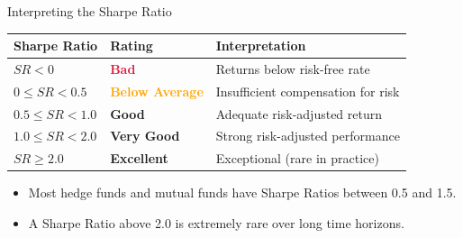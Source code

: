\documentclass[9pt, aspectratio=169, t]{beamer}
\theoremstyle{definition}
\begin{document}
\begin{frame}{Interpreting the Sharpe Ratio}

\begin{center}
\renewcommand{\arraystretch}{1.6}
\begin{tabular}{>{\centering\arraybackslash}m{3.5cm} >{\centering\arraybackslash}m{4cm} >{\centering\arraybackslash}m{5cm}}
\toprule
\textbf{Sharpe Ratio} & \textbf{Rating} & \textbf{Interpretation} \\
\midrule
\cellcolor{Crimson!20} $SR < 0$ & \cellcolor{Crimson!20}\textcolor{Crimson}{\textbf{Bad}} & \cellcolor{Crimson!20} Returns below risk-free rate \\
\cellcolor{Orange!20} $0 \leq SR < 0.5$ & \cellcolor{Orange!20}\textcolor{Orange}{\textbf{Below Average}} & \cellcolor{Orange!20} Insufficient compensation for risk \\
\cellcolor{Amber!20} $0.5 \leq SR < 1.0$ & \cellcolor{Amber!20}\textcolor{Amber}{\textbf{Good}} & \cellcolor{Amber!20} Adequate risk-adjusted return \\
\cellcolor{Forest!15} $1.0 \leq SR < 2.0$ & \cellcolor{Forest!15}\textcolor{Forest}{\textbf{Very Good}} & \cellcolor{Forest!15} Strong risk-adjusted performance \\
\cellcolor{Forest!30} $SR \geq 2.0$ & \cellcolor{Forest!30}\textcolor{Forest!80!black}{\textbf{Excellent}} & \cellcolor{Forest!30} Exceptional (rare in practice) \\
\bottomrule
\end{tabular}
\end{center}

\vspace{0.4cm}

\begin{itemize}
    \item Most hedge funds and mutual funds have Sharpe Ratios between 0.5 and 1.5.
    \item A Sharpe Ratio above 2.0 is extremely rare over long time horizons.
\end{itemize}

\end{frame}
\end{document}
